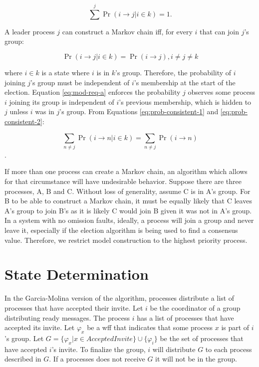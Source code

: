 \begin{equation}
\sum^{j} \Pr(i \rightarrow j | i \in k) = 1.
\label{eq:prob-consistent-2}
\end{equation}

A leader process $j$ can construct a Markov chain iff, for every $i$ that can join $j$'s group:

\begin{equation}
\Pr(i \rightarrow j | i \in k) = \Pr(i \rightarrow j), i \neq j \neq k
\label{eq:mod-req-a}
\end{equation}

where $i \in k$ is a state where $i$ is in $k$'s group.
Therefore, the probability of $i$ joining $j$'s group must be independent of $i$'s membership at the start of the election.
Equation \ref{eq:mod-req-a} enforces the probability $j$ observes some process $i$ joining its group is independent of $i$'s previous membership, which is hidden to $j$ unless $i$ was in $j$'s group.
From Equations \ref{eq:prob-consistent-1} and \ref{eq:prob-consistent-2}:

\begin{equation}
\sum_{n \neq j} \Pr(i \rightarrow n | i \in k) = \sum_{n\neq j} \Pr(i \rightarrow n)
\label{eq:mod-req-b}
\end{equation}.

If more than one process can create a Markov chain, an algorithm which allows for that circumstance will have undesirable behavior.
Suppose there are three processes, A, B and C.
Without loss of generality, assume C is in A's group.
For B to be able to construct a Markov chain, it must be equally likely that C leaves A's group to join B's as it is likely C would join B given it was not in A's group.
In a system with no omission faults, ideally, a process will join a group and never leave it, especially if the election algorithm is being used to find a consensus value.
Therefore, we restrict model construction to the highest priority process.

\section{State Determination}

In the Garcia-Molina version of the algorithm, processes distribute a list of processes that have accepted their invite.
Let $i$ be the coordinator of a group distributing ready messages.
The process $i$ has a list of processes that have accepted its invite.
Let $\varphi_x$ be a wff that indicates that some process $x$ is part of $i$'s group.
Let $G = \{ \varphi_x | x \in AcceptedInvite \} \cup \{ \varphi_i \}$ be the set of processes that have accepted $i$'s invite.
To finalize the group, $i$ will distribute $G$ to each process described in $G$.
If a processes does not receive $G$ it will not be in the group.

